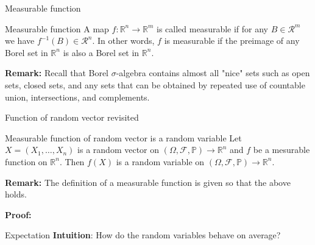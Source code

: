 \documentclass [aspectratio=169]{beamer}
\begin{document}
\begin{frame}{Measurable function}

\begin{block}{Measurable function}
A map $f: \mathbb{R}^n \to \mathbb{R}^m$ is called measurable if for any $B \in \mathcal{R}^m$ we have $f^{-1}(B) \in \mathcal{R}^n$. In other words, $f$ is measurable if the preimage of any Borel set in $\mathbb{R}^n$ is also a Borel set in $\mathbb{R}^n$.
\end{block}

\textbf{Remark:} Recall that Borel $\sigma$-algebra contains almost all "nice" sets such as open sets, closed sets, and any sets that can be obtained by repeated use of countable union, intersections, and complements.

\end{frame}

\begin{frame}{Function of random vector revisited}

\begin{block}{Measurable function of random vector is a random variable}
Let $X = (X_1, \ldots, X_n)$ is a random vector on $(\Omega, \mathcal F, \mathbb P) \to \mathbb R^n$ and $f$ be a mesurable function on $\mathbb R^n$. Then $f(X)$ is a random variable on $(\Omega, \mathcal F, \mathbb P) \to \mathbb R^n$.
\end{block}

\textbf{Remark:} The definition of a measurable function is given so that the above holds.

\vspace{1mm}

\textbf{Proof:}

\vspace{1.2in}

\end{frame}

\begin{frame}{Expectation}
\textbf{Intuition}: How do the random variables behave on average?\\
\end{frame}
\end{document}
